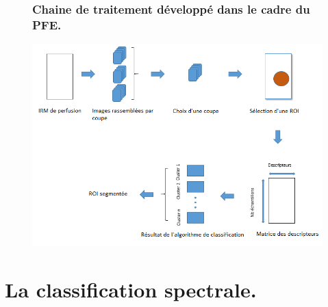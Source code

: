 \documentclass{beamer}
\begin{document}
\begin{frame}

\begin{figure}

\frametitle{Chaine de traitement développé dans le cadre du PFE.}
\centering
    \includegraphics[scale=0.5,angle=0]{Processing_toolchain.PNG}
    \label{fig:Chaine} 
    
\end{figure}

\end{frame}


\section{La classification spectrale.}
\end{document}
